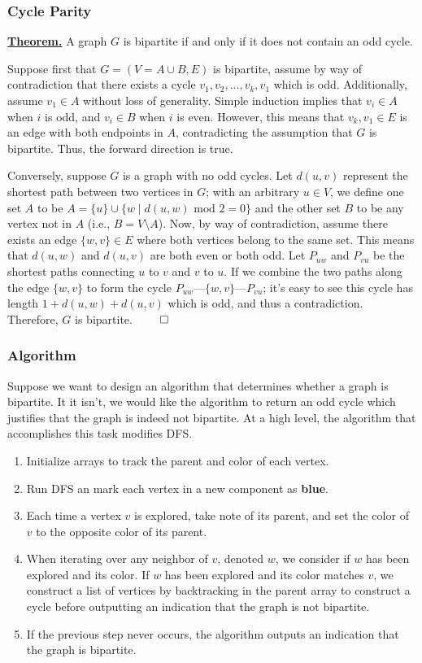 \documentclass[11pt]{article}
\begin{document}
\subsubsection{Cycle Parity}
\underline{\textbf{Theorem.}} A graph $G$ is bipartite if and only if it does not contain an odd cycle. 

Suppose first that $G = (V = A \cup B, E)$ is bipartite, assume by way of contradiction that there exists a cycle $v_1, v_2, \dots, v_k, v_1$ which is odd. Additionally, assume $v_1 \in A$ without loss of generality. Simple induction implies that $v_i \in A$ when $i$ is odd, and $v_i \in B$ when $i$ is even. However, this means that ${v_k, v_1} \in E$ is an edge with both endpoints in $A$, contradicting the assumption that $G$ is bipartite. Thus, the forward direction is true. 

Conversely, suppose $G$ is a graph with no odd cycles. Let $d(u, v)$ represent the shortest path between two vertices in $G$; with an arbitrary $u \in V$, we define one set $A$ to be $A = \{u\} \cup \{w \mid d(u, w) \text{ mod }2 = 0\}$ and the other set $B$ to be any vertex not in $A$ (i.e., $B = V \setminus A$). Now, by way of contradiction, assume there exists an edge $\{w, v\} \in E$ where both vertices belong to the same set. This means that $d(u, w)$ and $d(u, v)$ are both even or both odd. Let $P_{uw}$ and $P_{vu}$ be the shortest paths connecting $u$ to $v$ and $v$ to $u$. If we combine the two paths along the edge $\{w, v\}$ to form the cycle $P_{uw} \mbox{---} \{w, v\} \mbox{---} P_{vu}$; it's easy to see this cycle has length $1 + d(u, w) + d(u, v)$ which is odd, and thus a contradiction. Therefore, $G$ is bipartite. \hfill $\qed$

\subsubsection{Algorithm}
Suppose we want to design an algorithm that determines whether a graph is bipartite. It it isn't, we would like the algorithm to return an odd cycle which justifies that the graph is indeed not bipartite. At a high level, the algorithm that accomplishes this task modifies DFS. 
\newpage
\begin{enumerate}
    \item Initialize arrays to track the parent and color of each vertex. 
    \item Run DFS an mark each vertex in a new component as \textcolor{DeepSkyBlue3}{\textbf{blue}}.
    \item Each time a vertex $v$ is explored, take note of its parent, and set the color of $v$ to the opposite color of its parent. 
    \item When iterating over any neighbor of $v$, denoted $w$, we consider if $w$ has been explored and its color. If $w$ has been explored and its color matches $v$, we construct a list of vertices by backtracking in the parent array to construct a cycle before outputting an indication that the graph is not bipartite.
    \item If the previous step never occurs, the algorithm outputs an indication that the graph is bipartite. 
\end{enumerate}
\end{document}
